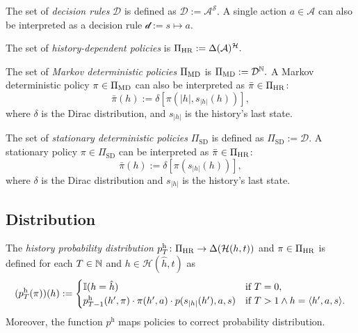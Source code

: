 \begin{definition} \label{def:decision-rule}
The set of \emph{decision rules} $\mathcal{D}$ is defined as \(\mathcal{D} := \mathcal{A}^{\mathcal{S}}. \) A single action $a \in \mathcal{A}$ can also be interpreted as a decision rule $\mathcal{d} := s \mapsto a$.
\end{definition}

\begin{definition} \label{def:policy-hr}
The set of \emph{history-dependent policies} is \(\Pi_{\mathrm{HR}} :=  \Delta(\mathcal{A})^{\mathcal{H}}. \)
\end{definition}


\begin{definition} \label{def:policy-md}
The set of \emph{Markov deterministic policies} $\Pi_{\mathrm{MD}}$ is \(\Pi_{\mathrm{MD}} :=  \mathcal{D}^{\mathbb{N}}. \)
A Markov deterministic policy $\pi \in \Pi_{\mathrm{MD}}$ can also be interpreted as $\bar{\pi} \in \Pi_{\mathrm{HR}}$:
\[
  \bar{\pi}(h) := \delta \left[  \pi(|h|, s_{|h|}(h)) \right],
\]
where $\delta$ is the Dirac distribution,  and $s_{|h|}$ is the history's last state.
\end{definition}

\begin{definition} \label{def:policy-sd}
The set of \emph{stationary deterministic policies} $\Pi_{\mathrm{SD}}$ is defined as \(\Pi_{\mathrm{SD}} := \mathcal{D}. \)
A stationary policy $\pi \in \Pi_{\mathrm{SD}}$ can be interpreted as $\bar{\pi} \in \Pi_{\mathrm{HR}}$:
\[
  \bar{\pi}(h) := \delta \left[  \pi(s_{|h|}(h)) \right],
\]
where $\delta$ is the Dirac distribution and $s_{|h|}$ is the history's last state.
\end{definition}

\subsection{Distribution}


\begin{definition}\label{def:hist-dist}
The \emph{history probability distribution} $p^{\mathrm{h}}_T \colon  \Pi_{\mathrm{HR}} \to \Delta(\mathcal{H}(h,t))$  and $\pi \in \Pi_{\mathrm{HR}}$ is defined for each $T \in \mathbb{N}$ and $h\in \mathcal{H}(\hat{h},t)$ as
\[
(p^{\mathrm{h}}_T(\pi))(h) :=
\begin{cases}
\mathbb{I}(h = \hat{h}) &\text{if } T = 0, \\
p_{T-1}^{\mathrm{h}}(h', \pi) \cdot \pi(h',a) \cdot  p(s_{|h|}(h'), a , s) &\text{if } T > 1 \wedge h = \langle h', a, s \rangle.
\end{cases}
\]
Moreover, the function $p^{\mathrm{h}}$ maps policies to correct probability distribution.
\end{definition}

